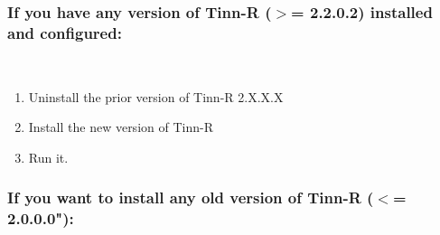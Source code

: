 \subsubsection{If you have any version of Tinn-R ($>$= 2.2.0.2) installed and configured:}\\

\begin{enumerate}
  \item Uninstall the prior version of Tinn-R 2.X.X.X
  \item Install the new version of Tinn-R
  \item Run it.
\end{enumerate}


\subsubsection{If you want to install any old version of Tinn-R ($<$= 2.0.0.0"):}\\

